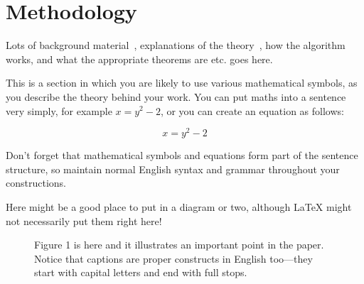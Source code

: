 \section{Methodology}

Lots of background material~\cite{Du}, explanations of the
theory~\cite{Fourier}, how the algorithm works, and what the
appropriate theorems are etc. goes here.

This is a section in which you are likely to use various mathematical
symbols, as you describe the theory behind your work. You can put
maths into a sentence very simply, for example $x = y^2 - 2$, or
you can create an equation as follows:

\begin{equation}
x = y^2 - 2
\end{equation}

Don't forget that mathematical symbols and equations form part of the sentence
structure, so maintain normal English syntax and grammar throughout
your constructions.

Here might be a good place to put in a diagram or two, although \LaTeX\/
might not necessarily put them right here!

\begin{figure}[htbp]
\par
\centerline{}
\par
\caption{Figure 1 is here and it illustrates an important point in the paper.
Notice that captions are proper constructs in English too---they start with
capital letters and end with full stops.}
\end{figure}

